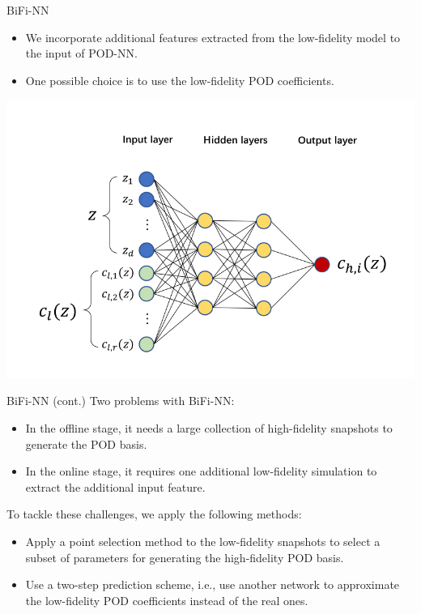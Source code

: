 \documentclass[10pt]{beamer}
\begin{document}
\begin{frame}{BiFi-NN}
\begin{itemize}
\item We incorporate additional features extracted from the low-fidelity model to the input of POD-NN\cite{lu2019bifidelity}.
\item One possible choice is to use the low-fidelity POD coefficients. 
\end{itemize}

\includegraphics[scale=0.6]{figures/BFNN.pdf}

\end{frame}

\begin{frame}{BiFi-NN (cont.)}
Two problems with BiFi-NN:
\begin{itemize}
\item In the offline stage, it needs a large collection of high-fidelity snapshots to generate the POD basis.
\item In the online stage, it requires one additional low-fidelity simulation to extract the additional input feature.

\end{itemize}
\pause

To tackle these challenges, we apply the following methods:
\begin{itemize}
\item Apply a point selection method to the low-fidelity snapshots to select a subset of parameters for generating the high-fidelity POD basis.
\item Use a two-step prediction scheme, i.e., use another network to approximate the low-fidelity POD coefficients instead of the real ones.
\end{itemize}
\end{frame}
\end{document}
